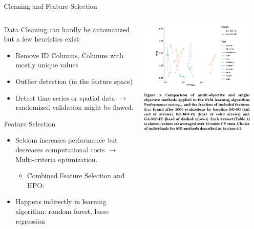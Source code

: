 \begin{frame}{Cleaning and Feature Selection}
    \begin{columns}
      \begin{column}{0.7\textwidth}

        Data Cleaning can hardly be automatized but a few heuristics exist:
        \begin{itemize}
          \item Remove ID Columns, Columns with mostly unique values
          \item Outlier detection (in the feature space)
          \item Detect time series or spatial data $\rightarrow$ randomized validation might be flawed.
        \end{itemize}

        Feature Selection
        \begin{itemize}
          \item Seldom increases performance but decreases computational costs $\rightarrow$ Multi-criteria optimization.
          \begin{itemize}
            \item Combined Feature Selection and HPO: 
          \end{itemize}
          \item Happens indirectly in learning algorithm: random forest, lasso regression %
        \end{itemize}
      \end{column}%
      \begin{column}{0.3\textwidth}
        \begin{center}
          \includegraphics[width = \linewidth]{images/Binder2020multiobjective_fig3.pdf}


\end{center}
\end{column}
\end{columns}
\end{frame}
